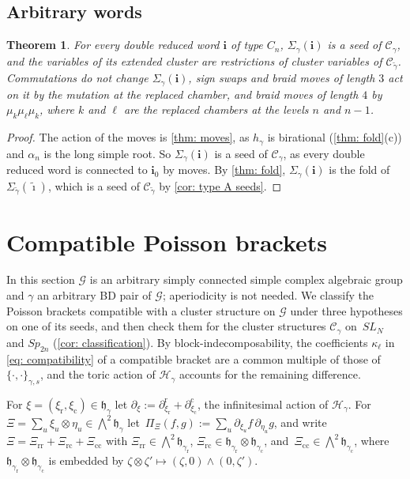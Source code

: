 \documentclass[a4paper]{amsart}
\numberwithin{equation}{section}
\newtheorem{theorem}{Theorem}[section]
\theoremstyle{definition}
\theoremstyle{remark}
\newcommand{\mfh}{\mathfrak{h}}
\newcommand{\mcG}{\mathcal{G}}
\newcommand{\mcH}{\mathcal{H}}
\newcommand{\mcC}{\mathcal{C}}
\newcommand{\bfi}{\mathbf{i}}
\newcommand{\tbfi}{\widetilde{\boldsymbol{\imath}}}
\newcommand{\tg}{\widetilde{\gamma}}
\newcommand{\rr}{\mathrm{r}}
\newcommand{\cc}{\mathrm{c}}
\newcommand{\toric}{\Pi}
\newcommand{\Sp}{Sp_{2n}}
\begin{document}
\subsection{Arbitrary words}
\begin{theorem}
  \label{thm: all words}
  For every double reduced word $\bfi$ of type $C_n$, $\Sigma_\gamma(\bfi)$ is a seed of $\mcC_\gamma$, and the variables of its extended cluster are restrictions of cluster variables of $\mcC_{\tg}$.
  Commutations do not change $\Sigma_\gamma(\bfi)$, sign swaps and braid moves of length $3$ act on it by the mutation at the replaced chamber, and braid moves of length $4$ by $\mu_k\mu_\ell\mu_k$, where $k$ and $\ell$ are the replaced chambers at the levels $n$ and $n-1$.
\end{theorem}
\begin{proof}
  The action of the moves is \cref{thm: moves}, as $h_\gamma$ is birational (\cref{thm: fold}(c)) and $\alpha_n$ is the long simple root.
  So $\Sigma_\gamma(\bfi)$ is a seed of $\mcC_\gamma$, as every double reduced word is connected to $\bfi_0$ by moves.
  By \cref{thm: fold}, $\Sigma_\gamma(\bfi)$ is the fold of $\Sigma_{\tg}(\tbfi)$, which is a seed of $\mcC_{\tg}$ by \cref{cor: type A seeds}.
\end{proof}

\section{Compatible Poisson brackets}
\label{sec: brackets}
In this section $\mcG$ is an arbitrary simply connected simple complex algebraic group and $\gamma$ an arbitrary BD pair of $\mcG$; aperiodicity is not needed.
We classify the Poisson brackets compatible with a cluster structure on $\mcG$ under three hypotheses on one of its seeds, and then check them for the cluster structures $\mcC_\gamma$ on~$SL_N$ and $\Sp$ (\cref{cor: classification}).
By block-indecomposability, the coefficients $\kappa_\ell$ in \eqref{eq: compatibility} of a compatible bracket are a common multiple of those of $\{\cdot,\cdot\}_{\gamma,s}$, and the toric action of $\mcH_\gamma$ accounts for the remaining difference.

For $\xi=(\xi_{\rr},\xi_{\cc})\in\mfh_\gamma$ let $\partial_\xi:=\partial^\rr_{\xi_{\rr}}+\partial^\cc_{\xi_{\cc}}$, the infinitesimal action of $\mcH_\gamma$.
For $\Xi=\sum_u\xi_u\otimes\eta_u\in\bigwedge^2\mfh_\gamma$ let~$\toric_\Xi(f,g):=\sum_u\partial_{\xi_u}f\,\partial_{\eta_u}g$, and write $\Xi=\Xi_\mathrm{rr}+\Xi_\mathrm{rc}+\Xi_\mathrm{cc}$ with $\Xi_\mathrm{rr}\in\bigwedge^2\mfh_{\gamma_{\rr}}$, $\Xi_\mathrm{rc}\in\mfh_{\gamma_{\rr}}\otimes\mfh_{\gamma_{\cc}}$, and~$\Xi_\mathrm{cc}\in\bigwedge^2\mfh_{\gamma_{\cc}}$, where $\mfh_{\gamma_{\rr}}\otimes\mfh_{\gamma_{\cc}}$ is embedded by $\zeta\otimes\zeta'\mapsto(\zeta,0)\wedge(0,\zeta')$.
\end{document}
